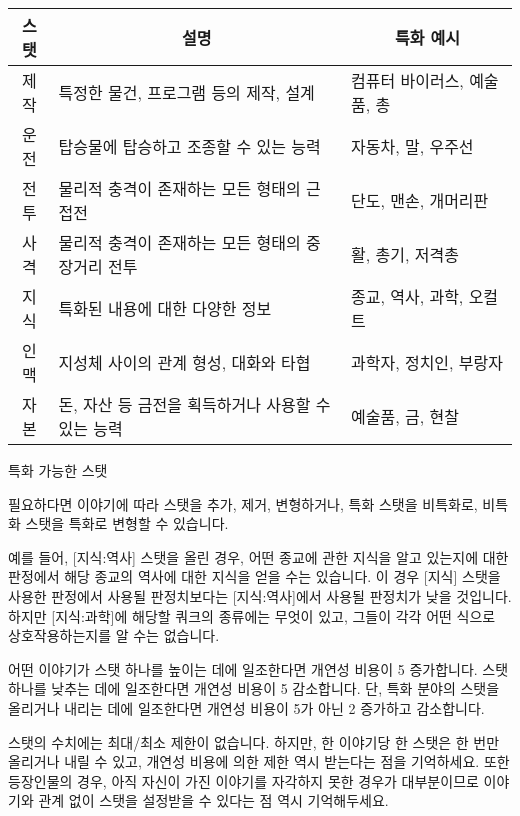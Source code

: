 \documentclass[12pt]{report}
\begin{document}
	\begin{tabularx}{\textwidth}{c|X|l}
	\hline
	\textbf{스탯} & \multicolumn{1}{c|}{\textbf{설명}} & \multicolumn{1}{c}{\textbf{특화 예시}} \\ \hline \hline
		제작          & 특정한 물건, 프로그램 등의 제작, 설계          & 컴퓨터 바이러스, 예술품, 총          \\\hline
		운전          & 탑승물에 탑승하고 조종할 수 있는 능력           & 자동차, 말, 우주선         \\\hline
		전투          & 물리적 충격이 존재하는 모든 형태의 근접전         & 단도, 맨손, 개머리판         \\\hline
		사격          & 물리적 충격이 존재하는 모든 형태의 중장거리 전투     & 활, 총기, 저격총         \\\hline
		지식          & 특화된 내용에 대한 다양한 정보               & 종교, 역사, 과학, 오컬트         \\\hline
		인맥          & 지성체 사이의 관계 형성, 대화와 타협           & 과학자, 정치인, 부랑자         \\\hline
		자본          & 돈, 자산 등 금전을 획득하거나 사용할 수 있는 능력   & 예술품, 금, 현찰  \\\hline
	\end{tabularx}
	
	\begin{center}
		특화 가능한 스탯
	\end{center}
	
	\bigskip
	
	필요하다면 이야기에 따라 스탯을 추가, 제거, 변형하거나, 특화 스탯을 비특화로, 비특화 스탯을 특화로 변형할 수 있습니다.
	
	\bigskip
	
	예를 들어, [지식:역사] 스탯을 올린 경우, 어떤 종교에 관한 지식을 알고 있는지에 대한 판정에서 해당 종교의 역사에 대한 지식을 얻을 수는 있습니다. 이 경우 [지식] 스탯을 사용한 판정에서 사용될 판정치보다는 [지식:역사]에서 사용될 판정치가 낮을 것입니다. 하지만 [지식:과학]에 해당할 쿼크의 종류에는 무엇이 있고, 그들이 각각 어떤 식으로 상호작용하는지를 알 수는 없습니다.
	
	\bigskip
	
	어떤 이야기가 스탯 하나를 높이는 데에 일조한다면 개연성 비용이 5 증가합니다. 스탯 하나를 낮추는 데에 일조한다면 개연성 비용이 5 감소합니다.
	단, 특화 분야의 스탯을 올리거나 내리는 데에 일조한다면 개연성 비용이 5가 아닌 2 증가하고 감소합니다.
	
	\bigskip
	
	스탯의 수치에는 최대/최소 제한이 없습니다. 하지만, 한 이야기당 한 스탯은 한 번만 올리거나 내릴 수 있고, 개연성 비용에 의한 제한 역시 받는다는 점을 기억하세요. 또한 등장인물의 경우, 아직 자신이 가진 이야기를 자각하지 못한 경우가 대부분이므로 이야기와 관계 없이 스탯을 설정받을 수 있다는 점 역시 기억해두세요.
	
\end{document}
